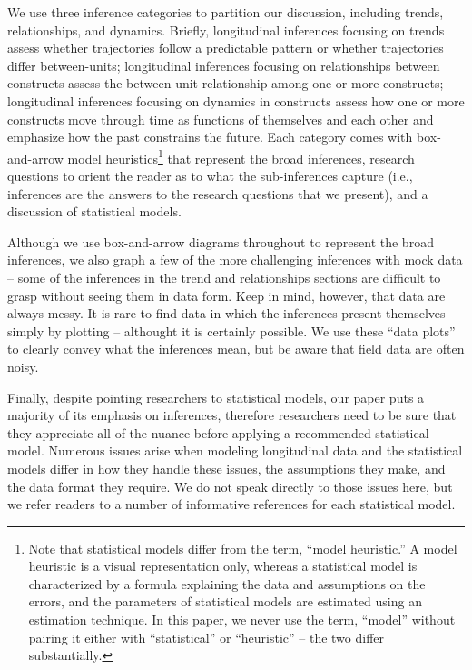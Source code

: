 \documentclass[english,,man]{apa6}
\let\rmarkdownfootnote\footnote%
\def\footnote{\protect\rmarkdownfootnote}
\theoremstyle{definition}
\theoremstyle{definition}
\theoremstyle{definition}
\theoremstyle{remark}
\begin{document}
We use three inference categories to partition our discussion, including
trends, relationships, and dynamics. Briefly, longitudinal inferences
focusing on trends assess whether trajectories follow a predictable
pattern or whether trajectories differ between-units; longitudinal
inferences focusing on relationships between constructs assess the
between-unit relationship among one or more constructs; longitudinal
inferences focusing on dynamics in constructs assess how one or more
constructs move through time as functions of themselves and each other
and emphasize how the past constrains the future. Each category comes
with box-and-arrow model heuristics\footnote{Note that statistical
  models differ from the term, \enquote{model heuristic.} A model
  heuristic is a visual representation only, whereas a statistical model
  is characterized by a formula explaining the data and assumptions on
  the errors, and the parameters of statistical models are estimated
  using an estimation technique. In this paper, we never use the term,
  \enquote{model} without pairing it either with \enquote{statistical}
  or \enquote{heuristic} -- the two differ substantially.} that
represent the broad inferences, research questions to orient the reader
as to what the sub-inferences capture (i.e., inferences are the answers
to the research questions that we present), and a discussion of
statistical models.

Although we use box-and-arrow diagrams throughout to represent the broad
inferences, we also graph a few of the more challenging inferences with
mock data -- some of the inferences in the trend and relationships
sections are difficult to grasp without seeing them in data form. Keep
in mind, however, that data are always messy. It is rare to find data in
which the inferences present themselves simply by plotting -- althought
it is certainly possible. We use these \enquote{data plots} to clearly
convey what the inferences mean, but be aware that field data are often
noisy.

Finally, despite pointing researchers to statistical models, our paper
puts a majority of its emphasis on inferences, therefore researchers
need to be sure that they appreciate all of the nuance before applying a
recommended statistical model. Numerous issues arise when modeling
longitudinal data and the statistical models differ in how they handle
these issues, the assumptions they make, and the data format they
require. We do not speak directly to those issues here, but we refer
readers to a number of informative references for each statistical
model.
\end{document}
